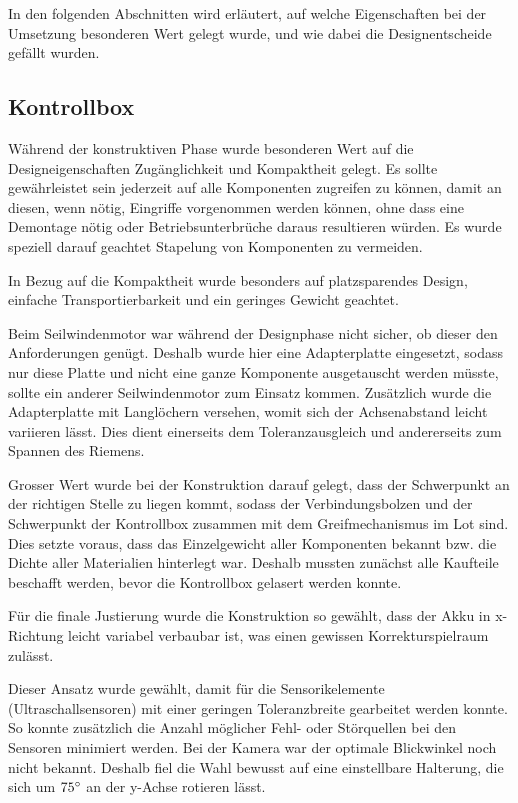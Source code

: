 In den folgenden Abschnitten wird erläutert, auf welche Eigenschaften bei der Umsetzung besonderen Wert gelegt wurde, und wie dabei die Designentscheide gefällt wurden.

\subsection{Kontrollbox}

Während der konstruktiven Phase wurde besonderen Wert auf die Designeigenschaften Zugänglichkeit und Kompaktheit gelegt. Es sollte gewährleistet sein jederzeit auf alle Komponenten zugreifen zu können, damit an diesen, wenn nötig, Eingriffe vorgenommen werden können, ohne dass eine Demontage nötig oder Betriebsunterbrüche daraus resultieren würden. Es wurde speziell darauf geachtet Stapelung von Komponenten zu vermeiden.

In Bezug auf die Kompaktheit wurde besonders auf platzsparendes Design, einfache Transportierbarkeit und ein geringes Gewicht geachtet.

Beim Seilwindenmotor war während der Designphase nicht sicher, ob dieser den Anforderungen genügt. Deshalb wurde hier eine Adapterplatte eingesetzt, sodass nur diese Platte und nicht eine ganze Komponente ausgetauscht werden müsste, sollte ein anderer Seilwindenmotor zum Einsatz kommen. Zusätzlich wurde die Adapterplatte mit Langlöchern versehen, womit sich der Achsenabstand leicht variieren lässt. Dies dient einerseits dem Toleranzausgleich und andererseits zum Spannen des Riemens.

Grosser Wert wurde bei der Konstruktion darauf gelegt, dass der Schwerpunkt an der richtigen Stelle zu liegen kommt, sodass der Verbindungsbolzen und der Schwerpunkt der Kontrollbox zusammen mit dem Greifmechanismus im Lot sind. Dies setzte voraus, dass das Einzelgewicht aller Komponenten bekannt bzw. die Dichte aller Materialien hinterlegt war. Deshalb mussten zunächst alle Kaufteile beschafft werden, bevor die Kontrollbox gelasert werden konnte.

Für die finale Justierung wurde die Konstruktion so gewählt, dass der Akku in x-Richtung leicht variabel verbaubar ist, was einen gewissen Korrekturspielraum zulässt.

Dieser Ansatz wurde gewählt, damit für die Sensorikelemente (Ultraschallsensoren) mit einer geringen Toleranzbreite gearbeitet werden konnte. So konnte zusätzlich die Anzahl möglicher Fehl- oder Störquellen bei den Sensoren minimiert werden. Bei der Kamera war der optimale Blickwinkel noch nicht bekannt. Deshalb fiel die Wahl bewusst auf eine einstellbare Halterung, die sich um $75\degree$ an der y-Achse rotieren lässt.

